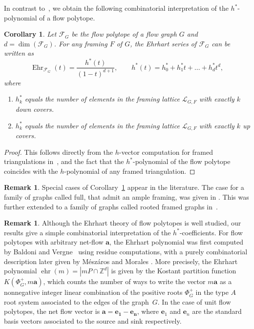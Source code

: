 \documentclass[12pt, reqno]{amsart}
\theoremstyle{plain}
\newtheorem{corollary}[theorem]{Corollary}
\theoremstyle{definition}
\newtheorem{remark}[theorem]{Remark}
\numberwithin{equation}{section}
\newcommand\calF{\mathcal{F}}
\newcommand\scrL{\mathscr{L}}
\begin{document}
In contrast to~, we obtain the following combinatorial interpretation of the \(h^*\)-polynomial of a flow polytope.
\begin{corollary}\label{cor_hStar_polynomial}
    Let $\calF_G$ be the flow polytope of a flow graph $G$ and $d = \dim(\calF_G)$. For any framing $F$ of $G$, the Ehrhart series of $\calF_G$ can be written as
    \[
    \operatorname{Ehr}_{\calF_G}(t) = \frac{h^*(t)}{(1-t)^{d+1}},
    \qquad
    h^*(t) = h_0^* + h_1^* t + \dots + h_d^* t^d,
    \]
    where
    \begin{enumerate}
        \item $h_k^*$ equals the number of elements in the framing lattice $\scrL_{G,F}$ with exactly $k$ down covers.
        \item $h_k^*$ equals the number of elements in the framing lattice $\scrL_{G,F}$ with exactly $k$ up covers.
    \end{enumerate}
\end{corollary}

\begin{proof}
    This follows directly from the $h$-vector computation for framed triangulations in~, and the fact that the $h^*$-polynomial of the flow polytope coincides with the $h$-polynomial of any framed triangulation.
\end{proof}

\begin{remark}
    Special cases of Corollary~\ref{cor_hStar_polynomial} appear in the literature. The case for a family of graphs called full, that admit an ample framing, was given in \cite[Lemma~6.10]{BBBHPSY24}. This was further extended to a family of graphs called rooted framed graphs in~\cite[Proposition~4.12]{BS24}.
\end{remark}

\begin{remark}
    Although the Ehrhart theory of flow polytopes is well studied, our results give a simple combinatorial interpretation of the $h^*$-coefficients. For flow polytopes with arbitrary net-flow $\mathbf{a}$, the Ehrhart polynomial was first computed by Baldoni and Vergne~\cite{baldoni2008} using residue computations, with a purely combinatorial description later given by M\'esz\'aros and Morales \cite{MeszarosMorales}. More precisely,
    the Ehrhart polynomial $\operatorname{ehr}(m)=|mP\cap \mathbb{Z}^d|$ is given by the Kostant partition function $K(\Phi_G^+, m\mathbf{a})$, which counts the number of ways to write the vector $m\mathbf{a}$ as a nonnegative integer linear combination of the positive roots $\Phi_G^+$ in the type $A$ root system associated to the edges of the graph~$G$. In the case of unit flow polytopes, the net flow vector is $\mathbf{a}=\mathbf{e_1}-\mathbf{e_n}$, where $\mathbf{e}_1$ and $\mathbf{e}_n$ are the standard basis vectors associated to the source and sink respectively.
\end{remark}
\end{document}
